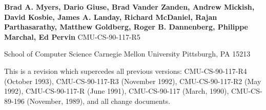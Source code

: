 
\begin{titlepage}
\begin{titlebox}
\vspace{0.4 inch}
\vspace{0.2 line}
{\bf Brad A. Myers, Dario Giuse, Brad Vander Zanden,
Andrew Mickish, David Kosbie, James A. Landay,
Richard McDaniel, Rajan Parthasarathy, Matthew Goldberg,
Roger B. Dannenberg, Philippe Marchal, Ed Pervin}
\vspace{0.2 line}
\value{date}
CMU-CS-90-117-R5
\end{titlebox}

\begin{center}
School of Computer Science
Carnegie Mellon University
Pittsburgh, PA 15213\end{center}
\vspace{0.4 in}

\begin{text}
\begin{center}
This is a revision which supercedes all previous versions:
CMU-CS-90-117-R4 (October 1993), CMU-CS-90-117-R3 (November 1992),
CMU-CS-90-117-R2 (May 1992), CMU-CS-90-117-R (June 1991),
CMU-CS-90-117 (March, 1990), CMU-CS-89-196 (November, 1989),
and all change documents.\end{center}
\vspace{0.4 in}

\end{text}
\end{titlepage}

